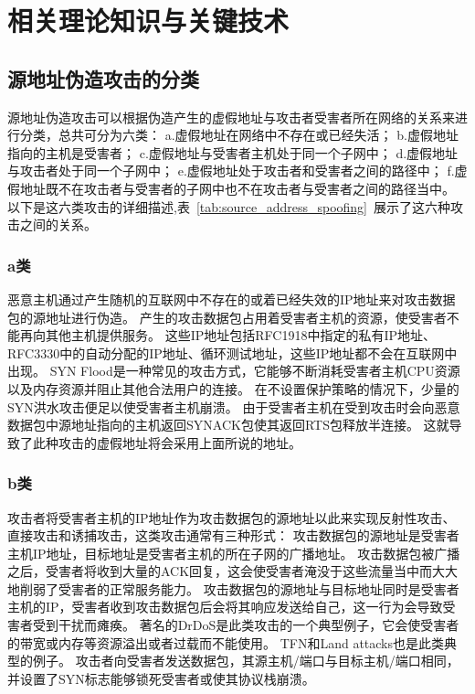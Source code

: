 \chapter{相关理论知识与关键技术}
\label{cha:basic-knowledge}
  
\section{源地址伪造攻击的分类}

源地址伪造攻击可以根据伪造产生的虚假地址与攻击者受害者所在网络的关系来进行分类，总共可分为六类：
a.虚假地址在网络中不存在或已经失活；
b.虚假地址指向的主机是受害者；
c.虚假地址与受害者主机处于同一个子网中；
d.虚假地址与攻击者处于同一个子网中；
e.虚假地址处于攻击者和受害者之间的路径中；
f.虚假地址既不在攻击者与受害者的子网中也不在攻击者与受害者之间的路径当中。
以下是这六类攻击的详细描述,表~\ref{tab:source_address_spoofing}~展示了这六种攻击之间的关系。

\subsection*{a类}
 恶意主机通过产生随机的互联网中不存在的或着已经失效的IP地址来对攻击数据包的源地址进行伪造。
 产生的攻击数据包占用着受害者主机的资源，使受害者不能再向其他主机提供服务。
 这些IP地址包括RFC1918中指定的私有IP地址\cite{Rekhter1996}、RFC3330中的自动分配的IP地址\cite{BogonList2003}、循环测试地址，这些IP地址都不会在互联网中出现。
SYN Flood是一种常见的攻击方式，它能够不断消耗受害者主机CPU资源以及内存资源并阻止其他合法用户的连接。
在不设置保护策略的情况下，少量的SYN洪水攻击便足以使受害者主机崩溃。
由于受害者主机在受到攻击时会向恶意数据包中源地址指向的主机返回SYNACK包使其返回RTS包释放半连接。
这就导致了此种攻击的虚假地址将会采用上面所说的地址。
\subsection*{b类}
攻击者将受害者主机的IP地址作为攻击数据包的源地址以此来实现反射性攻击、直接攻击和诱捕攻击，这类攻击通常有三种形式：
攻击数据包的源地址是受害者主机IP地址，目标地址是受害者主机的所在子网的广播地址。
攻击数据包被广播之后，受害者将收到大量的ACK回复，这会使受害者淹没于这些流量当中而大大地削弱了受害者的正常服务能力。
攻击数据包的源地址与目标地址同时是受害者主机的IP，受害者收到攻击数据包后会将其响应发送给自己，这一行为会导致受害者受到干扰而瘫痪。
著名的DrDoS\cite{Gibson2002}是此类攻击的一个典型例子，它会使受害者的带宽或内存等资源溢出或者过载而不能使用。
TFN\cite{Dittrich1999}和Land  attacks\cite{CERT1997}也是此类典型的例子。
攻击者向受害者发送数据包，其源主机/端口与目标主机/端口相同，并设置了SYN标志能够锁死受害者或使其协议栈崩溃。
